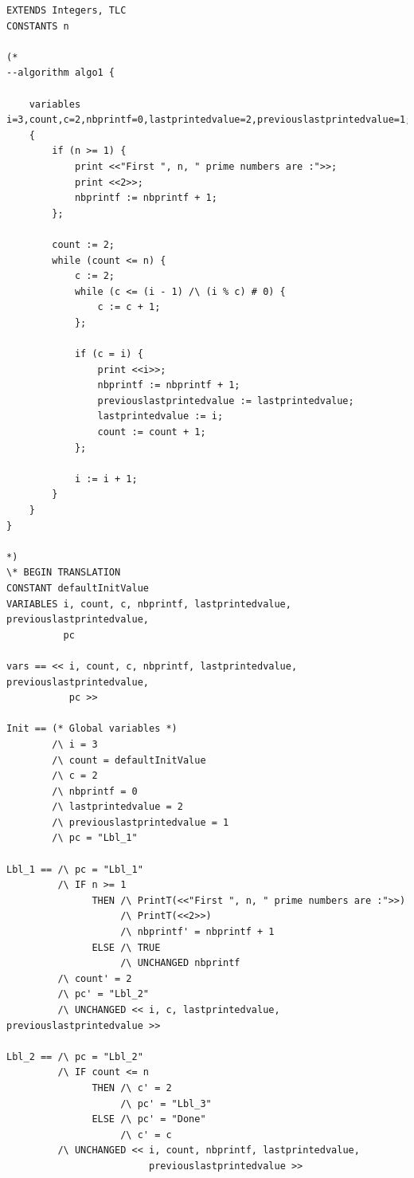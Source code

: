 \documentclass{scrreprt}
\begin{document}
\begin{lstlisting}
EXTENDS Integers, TLC
CONSTANTS n

(*
--algorithm algo1 {

    variables i=3,count,c=2,nbprintf=0,lastprintedvalue=2,previouslastprintedvalue=1;
    {
        if (n >= 1) {
            print <<"First ", n, " prime numbers are :">>;
            print <<2>>;
            nbprintf := nbprintf + 1;
        };
        
        count := 2;
        while (count <= n) {
            c := 2;
            while (c <= (i - 1) /\ (i % c) # 0) {
                c := c + 1;
            };
            
            if (c = i) {
                print <<i>>;
                nbprintf := nbprintf + 1;
                previouslastprintedvalue := lastprintedvalue;
                lastprintedvalue := i;
                count := count + 1;
            };
            
            i := i + 1;
        }
    }
}

*)
\* BEGIN TRANSLATION
CONSTANT defaultInitValue
VARIABLES i, count, c, nbprintf, lastprintedvalue, previouslastprintedvalue, 
          pc

vars == << i, count, c, nbprintf, lastprintedvalue, previouslastprintedvalue, 
           pc >>

Init == (* Global variables *)
        /\ i = 3
        /\ count = defaultInitValue
        /\ c = 2
        /\ nbprintf = 0
        /\ lastprintedvalue = 2
        /\ previouslastprintedvalue = 1
        /\ pc = "Lbl_1"

Lbl_1 == /\ pc = "Lbl_1"
         /\ IF n >= 1
               THEN /\ PrintT(<<"First ", n, " prime numbers are :">>)
                    /\ PrintT(<<2>>)
                    /\ nbprintf' = nbprintf + 1
               ELSE /\ TRUE
                    /\ UNCHANGED nbprintf
         /\ count' = 2
         /\ pc' = "Lbl_2"
         /\ UNCHANGED << i, c, lastprintedvalue, previouslastprintedvalue >>

Lbl_2 == /\ pc = "Lbl_2"
         /\ IF count <= n
               THEN /\ c' = 2
                    /\ pc' = "Lbl_3"
               ELSE /\ pc' = "Done"
                    /\ c' = c
         /\ UNCHANGED << i, count, nbprintf, lastprintedvalue, 
                         previouslastprintedvalue >>


\end{lstlisting}
\end{document}
